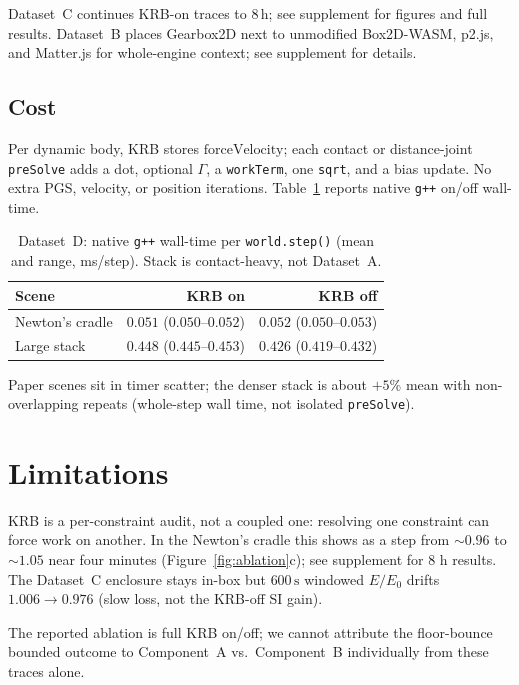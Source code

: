 \documentclass{jcgt}
\begin{document}
Dataset~C continues KRB-on traces to $8\,\mathrm{h}$; see supplement for figures and full results. Dataset~B places Gearbox2D next to unmodified Box2D-WASM, p2.js, and Matter.js for whole-engine context; see supplement for details.

\subsection{Cost}
\label{sec:dataset-d}

Per dynamic body, KRB stores $\mathrm{forceVelocity}$; each contact or distance-joint \texttt{preSolve} adds a dot, optional $\Gamma$, a \texttt{workTerm}, one \texttt{sqrt}, and a bias update. No extra PGS, velocity, or position iterations. Table~\ref{tab:dataset-d} reports native \texttt{g++} on/off wall-time.

\small
\begin{table}[htb]
  \caption{Dataset~D: native \texttt{g++} wall-time per \texttt{world.step()} (mean and range, ms/step). Stack is contact-heavy, not Dataset~A.}
  \label{tab:dataset-d}
  \centering
  \begin{tabular}{@{}lrr@{}}
    \hline
    Scene & KRB on & KRB off \\
    \hline
    Newton's cradle & $0.051$ ($0.050$--$0.052$) & $0.052$ ($0.050$--$0.053$) \\
    Large stack & $0.448$ ($0.445$--$0.453$) & $0.426$ ($0.419$--$0.432$) \\
    \hline
  \end{tabular}
\end{table}

Paper scenes sit in timer scatter; the denser stack is about $+5\%$ mean with non-overlapping repeats (whole-step wall time, not isolated \texttt{preSolve}).

\section{Limitations}
\label{sec:limitations}

KRB is a per-constraint audit, not a coupled one: resolving one constraint can force work on another. In the Newton's cradle this shows as a step from $\sim 0.96$ to $\sim 1.05$ near four minutes (Figure~\ref{fig:ablation}c); see supplement for 8 h results. The Dataset~C enclosure stays in-box but $600\,\mathrm{s}$ windowed $E/E_0$ drifts $1.006 \to 0.976$ (slow loss, not the KRB-off SI gain).

The reported ablation is full KRB on/off; we cannot attribute the floor-bounce bounded outcome to Component~A vs.\ Component~B individually from these traces alone.
\end{document}
